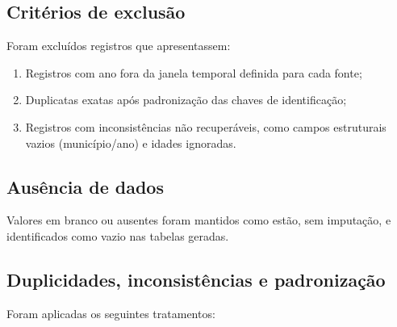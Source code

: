\subsection{Critérios de exclusão}

Foram excluídos registros que apresentassem:

\begin{enumerate}
    \item Registros com ano fora da janela temporal definida para cada fonte;
    \item Duplicatas exatas após padronização das chaves de identificação;
    \item Registros com inconsistências não recuperáveis, como campos estruturais vazios (município/ano) e idades ignoradas.
\end{enumerate}

\subsection{Ausência de dados}

Valores em branco ou ausentes foram mantidos como estão, sem imputação, e identificados como vazio nas tabelas geradas. 

\subsection{Duplicidades, inconsistências e padronização}

Foram aplicadas os seguintes tratamentos:

